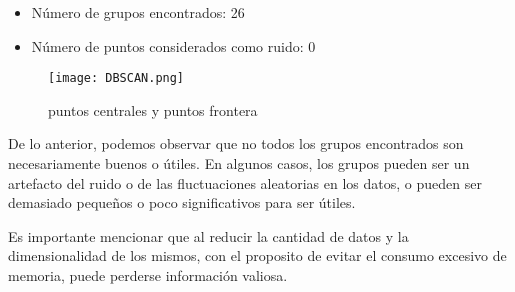 \documentclass{article}
\begin{document}
\begin{itemize}
\item Número de grupos encontrados: 26
\item Número de puntos considerados como ruido: 0
\end{itemize}

\begin{figure}[h]
\centering
\texttt{[image: DBSCAN.png]}
\caption{puntos centrales y puntos frontera}
\label{fig:reachability_plot}
\end{figure}

De lo anterior, podemos observar que no todos los grupos encontrados son necesariamente buenos o útiles. En algunos casos, los grupos pueden ser un artefacto del ruido o de las fluctuaciones aleatorias en los datos, o pueden ser demasiado pequeños o poco significativos para ser útiles. 

Es importante mencionar que al reducir la cantidad de datos y la dimensionalidad de los mismos, con el proposito de evitar el consumo excesivo de memoria, puede perderse información valiosa.
\end{document}
